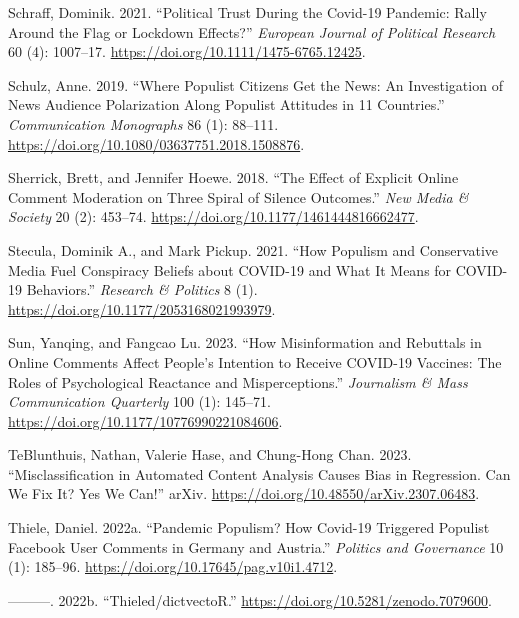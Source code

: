 \documentclass[
]{ccr}
\newlength{\cslhangindent}
\newlength{\cslentryspacingunit} %
\newenvironment{CSLReferences}[2] %
 {%
  \setlength{\parindent}{0pt}
  \ifodd #1
  \let\oldpar\par
  \def\par{\hangindent=\cslhangindent\oldpar}
  \fi
  \setlength{\parskip}{#2\cslentryspacingunit}
 }%
 {}
\begin{document}
\begin{CSLReferences}{1}{0}
\leavevmode{}%
Schraff, Dominik. 2021. {``Political Trust During the {Covid-19}
Pandemic: {Rally} Around the Flag or Lockdown Effects?''} \emph{European
Journal of Political Research} 60 (4): 1007--17.
\url{https://doi.org/10.1111/1475-6765.12425}.

\leavevmode{}%
Schulz, Anne. 2019. {``Where Populist Citizens Get the News: {An}
Investigation of News Audience Polarization Along Populist Attitudes in
11 Countries.''} \emph{Communication Monographs} 86 (1): 88--111.
\url{https://doi.org/10.1080/03637751.2018.1508876}.

\leavevmode{}%
Sherrick, Brett, and Jennifer Hoewe. 2018. {``The Effect of Explicit
Online Comment Moderation on Three Spiral of Silence Outcomes.''}
\emph{New Media \& Society} 20 (2): 453--74.
\url{https://doi.org/10.1177/1461444816662477}.

\leavevmode{}%
Stecula, Dominik A., and Mark Pickup. 2021. {``How Populism and
Conservative Media Fuel Conspiracy Beliefs about {COVID-19} and What It
Means for {COVID-19} Behaviors.''} \emph{Research \& Politics} 8 (1).
\url{https://doi.org/10.1177/2053168021993979}.

\leavevmode{}%
Sun, Yanqing, and Fangcao Lu. 2023. {``How {Misinformation} and
{Rebuttals} in {Online Comments Affect People}'s {Intention} to {Receive
COVID-19 Vaccines}: {The Roles} of {Psychological Reactance} and
{Misperceptions}.''} \emph{Journalism \& Mass Communication Quarterly}
100 (1): 145--71. \url{https://doi.org/10.1177/10776990221084606}.

\leavevmode{}%
TeBlunthuis, Nathan, Valerie Hase, and Chung-Hong Chan. 2023.
{``Misclassification in {Automated Content Analysis Causes Bias} in
{Regression}. {Can We Fix It}? {Yes We Can}!''} {arXiv}.
\url{https://doi.org/10.48550/arXiv.2307.06483}.

\leavevmode{}%
Thiele, Daniel. 2022a. {``Pandemic Populism? {How Covid-19} Triggered
Populist {Facebook} User Comments in {Germany} and {Austria}.''}
\emph{Politics and Governance} 10 (1): 185--96.
\url{https://doi.org/10.17645/pag.v10i1.4712}.

\leavevmode{}%
---------. 2022b. {``Thieled/{dictvectoR}.''}
\url{https://doi.org/10.5281/zenodo.7079600}.


\end{CSLReferences}
\end{document}

